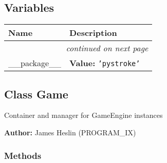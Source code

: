   \subsection{Variables}

    \vspace{-1cm}
\hspace{\varindent}\begin{longtable}{|p{\varnamewidth}|p{\vardescrwidth}|l}
\cline{1-2}
\cline{1-2} \centering \textbf{Name} & \centering \textbf{Description}& \\
\cline{1-2}
\endhead\cline{1-2}\multicolumn{3}{r}{\small\textit{continued on next page}}\\\endfoot\cline{1-2}
\endlastfoot\raggedright \_\-\_\-p\-a\-c\-k\-a\-g\-e\-\_\-\_\- & \raggedright \textbf{Value:} 
{\tt \texttt{'}\texttt{pystroke}\texttt{'}}&\\
\cline{1-2}
\end{longtable}



\subsection{Class Game}

    \label{pystroke:game:Game}
Container and manager for GameEngine instances

\textbf{Author:} James Heslin (PROGRAM\_IX)





  \subsubsection{Methods}

    \label{pystroke:game:Game:__init__}

    \vspace{0.5ex}

